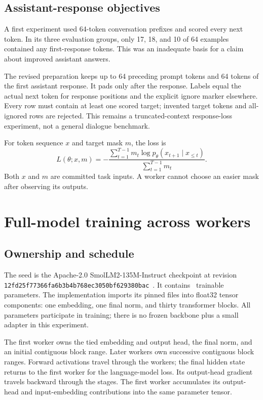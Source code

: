\documentclass[11pt]{article}
\begin{document}
\subsection{Assistant-response objectives}
A first experiment used 64-token conversation prefixes and scored every next token. In its three evaluation groups, only 17, 18, and 10 of 64 examples contained any first-response tokens. This was an inadequate basis for a claim about improved assistant answers.

The revised preparation keeps up to 64 preceding prompt tokens and 64 tokens of the first assistant response. It pads only after the response. Labels equal the actual next token for response positions and the explicit ignore marker elsewhere. Every row must contain at least one scored target; invented target tokens and all-ignored rows are rejected. This remains a truncated-context response-loss experiment, not a general dialogue benchmark.

For token sequence $x$ and target mask $m$, the loss is
\begin{equation}
 L(\theta;x,m)=-\frac{\sum_{t=1}^{T-1}m_t\log p_\theta(x_{t+1}\mid x_{\le t})}{\sum_{t=1}^{T-1}m_t}.
\end{equation}
Both $x$ and $m$ are committed task inputs. A worker cannot choose an easier mask after observing its outputs.

\section{Full-model training across workers}
\subsection{Ownership and schedule}
The seed is the Apache-2.0 SmolLM2-135M-Instruct checkpoint at revision \texttt{12fd25f77366fa6b3b4b7\allowbreak68ec3050bf629380bac}~\cite{smollm}. It contains \SeedParameters\ trainable parameters. The implementation imports its pinned files into float32 tensor components: one embedding, one final norm, and thirty transformer blocks. All parameters participate in training; there is no frozen backbone plus a small adapter in this experiment.

The first worker owns the tied embedding and output head, the final norm, and an initial contiguous block range. Later workers own successive contiguous block ranges. Forward activations travel through the workers; the final hidden state returns to the first worker for the language-model loss. Its output-head gradient travels backward through the stages. The first worker accumulates its output-head and input-embedding contributions into the same parameter tensor.
\end{document}
